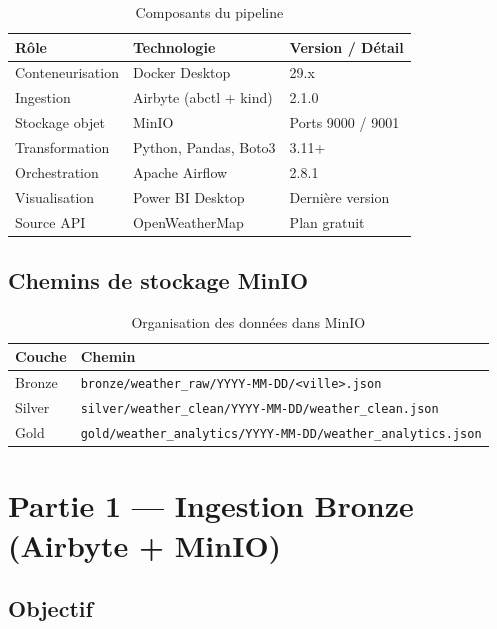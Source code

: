\documentclass[12pt,a4paper]{report}
\begin{document}
\begin{table}[H]
\centering
\caption{Composants du pipeline}
\begin{tabular}{@{}p{3.5cm}p{4cm}p{6cm}@{}}
\toprule
\textbf{Rôle} & \textbf{Technologie} & \textbf{Version / Détail} \\
\midrule
Conteneurisation & Docker Desktop & 29.x \\
Ingestion & Airbyte (abctl + kind) & 2.1.0 \\
Stockage objet & MinIO & Ports 9000 / 9001 \\
Transformation & Python, Pandas, Boto3 & 3.11+ \\
Orchestration & Apache Airflow & 2.8.1 \\
Visualisation & Power BI Desktop & Dernière version \\
Source API & OpenWeatherMap & Plan gratuit \\
\bottomrule
\end{tabular}
\end{table}

\section{Chemins de stockage MinIO}

\begin{table}[H]
\centering
\caption{Organisation des données dans MinIO}
\begin{tabular}{@{}ll@{}}
\toprule
\textbf{Couche} & \textbf{Chemin} \\
\midrule
Bronze & \texttt{bronze/weather\_raw/YYYY-MM-DD/<ville>.json} \\
Silver & \texttt{silver/weather\_clean/YYYY-MM-DD/weather\_clean.json} \\
Gold   & \texttt{gold/weather\_analytics/YYYY-MM-DD/weather\_analytics.json} \\
\bottomrule
\end{tabular}
\end{table}

\chapter{Partie 1 — Ingestion Bronze (Airbyte + MinIO)}

\section{Objectif}
\end{document}
